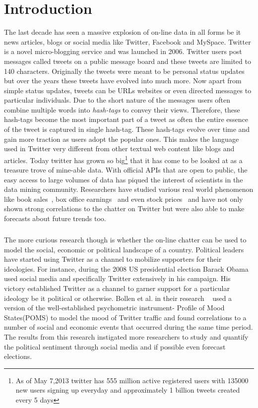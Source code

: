 \chapter{Introduction}
The last decade has seen a massive explosion of on-line data in all forms be it news articles, blogs or social media like Twitter, Facebook and MySpace.
Twitter is a novel micro-blogging service and was launched in 2006.
Twitter users post messages called tweets on a public message board  and these tweets are limited to 140 characters.
Originally the tweets were meant to be personal status updates but over the years these tweets have evolved into much more.
Now apart from simple status updates, tweets can be URLs websites or even directed messages to particular individuals.
Due to the short nature of the messages users often combine multiple words into \emph{hash-tags} to convey their views.
Therefore, these hash-tags become the most important part of a tweet as often the entire essence of the tweet is captured in single hash-tag.
These hash-tags evolve over time and gain more traction as users adopt the popular ones.
This makes the language used in Twitter very different from other textual web content like blogs and articles.
\newline
Today twitter has grown so big\footnote{As of May 7,2013 twitter has 555 million active registered users with 135000 new users signing up everyday and approximately 1 billion tweets created every 5 days}
that it has come to be looked at as a treasure trove of mine-able data.
With official APIs that are open to public, the easy access to large volumes of data has piqued the interest of scientists in the data mining community.
Researchers have studied various real world phenomenon like book sales~\cite{gruhl2005predictive}, box office earnings~\cite{asur2010predicting} and even stock prices~\cite{bollen2011twitter} and have not only shown  strong correlations to the chatter on Twitter but were also able to make forecasts about future trends too.
\paragraph{}
The more curious research though is whether the on-line chatter can be used to model the social, economic or political landscape of a country.
Political leaders have started using Twitter as a channel to mobilize supporters for their ideologies.
For instance, during the 2008 US presidential election Barack Obama used social media and specifically Twitter extensively in his campaign. 
His victory established Twitter as a channel to garner support for a particular ideology be it political or otherwise.
Bollen et al. in their research ~\cite{bollen2011modeling} used a version of the well-established psychometric instrument- Profile of Mood States(POMS) to model the mood of Twitter traffic and found correlations to a number of social and economic events that occurred during the same time period. 
The results from this research instigated more researchers to study and quantify the political sentiment through social media and if possible even forecast elections.
